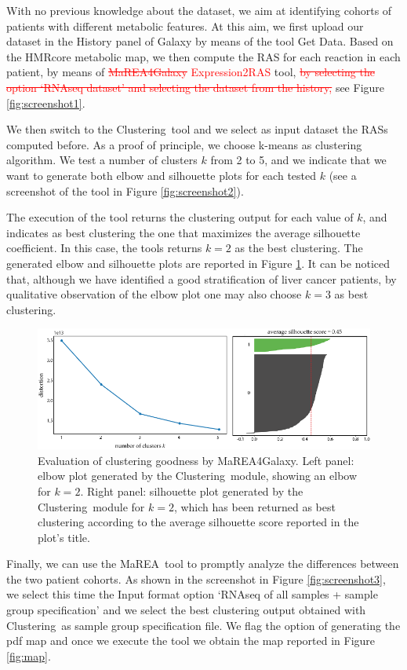 \documentclass[preprint,12pt,authoryear]{elsarticle}
\newcommand{\red}{\textcolor{red}}
\newcommand{\mareagalaxy}{\textsf{MaREA4Galaxy}}
\newcommand{\mareaTool}{\textsf{MaREA}}
\newcommand{\clusterTool}{\textsf{Clustering}}
\newcommand{\RASTool}{\textsf{Expression2RAS}}
\begin{document}
With no previous knowledge about the dataset, we aim at identifying cohorts of patients with different metabolic features.
At this aim, we first upload our dataset in the History panel of Galaxy by means of the tool Get Data. Based on the HMRcore metabolic map, we then compute the RAS for each reaction in each patient, by means of \red{\sout{\mareagalaxy} \RASTool} tool, \red{\sout{by selecting the option `RNAseq dataset' and selecting the dataset from the history,}} see Figure \ref{fig:screenshot1}.

We then switch to the \clusterTool\ tool and we select as input dataset the RASs computed before. As a proof of principle, we choose k-means as clustering algorithm. We test a number of clusters $k$ from 2 to 5, and we indicate that we want to generate both elbow and silhouette plots for each tested $k$ (see a screenshot of the tool in Figure \ref{fig:screenshot2}).

The execution of the tool returns the clustering output for each value of $k$, and indicates as best clustering the one that maximizes the average silhouette coefficient. 
In this case, the tools returns $k=2$ as the best clustering. The generated elbow and silhouette plots are reported in Figure \ref{fig:goodness}. It can be noticed that, although we have identified a good stratification of liver cancer patients, by qualitative observation of the elbow plot one may also choose $k=3$ as best clustering.

\begin{figure}[ht]
    \includegraphics[width=1\textwidth]{figs/goodness.png}
	\caption{Evaluation of clustering goodness by \mareagalaxy. Left panel: elbow plot generated by the \clusterTool\ module, showing an elbow for $k=2$. Right panel: silhouette plot generated by the \clusterTool\ module for $k=2$, which has been returned as best clustering according to the average silhouette score reported in the plot's title.}
	\label{fig:goodness}
\end{figure}

Finally, we can use the \mareaTool\ tool to promptly analyze the differences between the two patient cohorts. As shown in the screenshot in Figure \ref{fig:screenshot3}, we select this time 
the Input format option `RNAseq of all samples + sample group specification' and we select the best clustering output obtained with \clusterTool\ as sample group specification file. We flag the option of generating the pdf map and once we execute the tool we obtain the map reported in Figure \ref{fig:map}.
\end{document}
